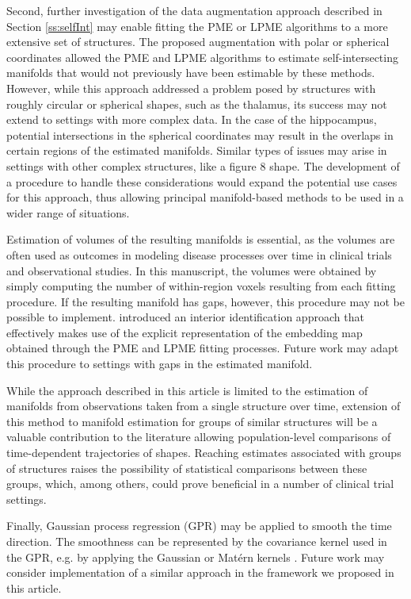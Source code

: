 \documentclass[12pt]{article}
\theoremstyle{definition}
\begin{document}
Second, further investigation of the  data augmentation approach described in Section \ref{ss:selfInt} may enable fitting the PME or LPME algorithms to a more extensive set of structures. The proposed augmentation with polar or spherical coordinates allowed the PME and LPME algorithms to estimate self-intersecting manifolds that would not previously have been estimable by these methods. However, while this approach addressed a problem posed by structures with roughly circular or spherical shapes, such as the thalamus, its success may not extend to settings with more complex data. In the case of the hippocampus, potential intersections in the spherical coordinates may result in the overlaps in certain regions of the estimated manifolds. Similar types of issues may arise in settings with other complex structures, like a figure 8 shape. The development of a procedure to handle these considerations would expand the potential use cases for this approach, thus allowing principal manifold-based methods to be used in a wider range of situations.

Estimation of volumes of the resulting manifolds is essential, as the volumes are often used as outcomes in modeling disease processes over time in clinical trials and observational studies. In this manuscript, the volumes were obtained by simply computing the number of within-region voxels resulting from each fitting procedure. If the resulting manifold has gaps, however, this procedure may not be possible to implement. \cite{mengPrincipalManifoldEstimation2021} introduced an interior identification approach that effectively makes use of the explicit representation of the embedding map obtained through the PME and LPME fitting processes. Future work may adapt this procedure to settings with gaps in the estimated manifold.

While the approach described in this article is limited to the estimation of manifolds from observations taken from a single structure over time, extension of this method to manifold estimation for groups of similar structures will be a valuable contribution to the literature allowing population-level comparisons of time-dependent trajectories of shapes. Reaching estimates associated with groups of structures raises the possibility of statistical comparisons between these groups, which, among others, could prove beneficial in a number of clinical trial settings.

Finally, Gaussian process regression (GPR) may be applied to smooth the time direction. The smoothness can be represented by the covariance kernel used in the GPR, e.g. by applying the Gaussian or Matérn kernels \citep{li2023inference}. Future work may consider implementation of a similar approach in the framework we proposed in this article. 
\end{document}
